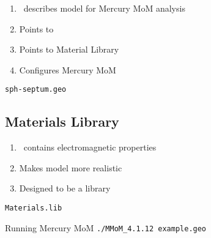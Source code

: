 \begin{frame}
\begin{enumerate}
\item \geo \ describes model for Mercury MoM analysis
\item Points to \facet 
\item Points to Material Library
\item Configures Mercury MoM
\end{enumerate}	
\end{frame}

\renewcommand{\listingFontSize}{\scriptsize} 
\begin{frame}{\texttt{sph-septum.geo}}
        \lstset{style=obj} %
\end{frame}

\subsection{Materials Library \lib}

\begin{frame}
\begin{enumerate}
\item \lib \ contains electromagnetic properties 
\item Makes model more realistic
\item Designed to be a library
\end{enumerate}	
\end{frame}

\renewcommand{\listingFontSize}{\scriptsize} 
\begin{frame}{\texttt{Materials.lib}}
        \lstset{style=obj} %
\end{frame}

\begin{frame}{Running Mercury MoM}
\centering
       \Large{ \texttt{./MMoM\_4.1.12 example.geo} }
\end{frame}
 
\endinput  %

